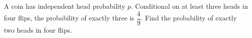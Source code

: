 A coin has independent head probability $p$. Conditional on at least three heads in four flips, the probability of exactly three is $\dfrac{4}{9}$. Find the probability of exactly two heads in four flips.
